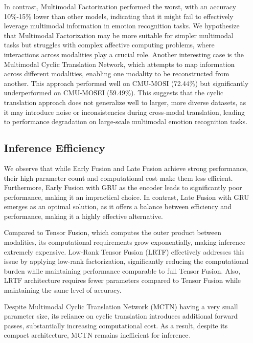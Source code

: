 \documentclass{article}
\begin{document}
In contrast, Multimodal Factorization performed the worst, with an accuracy 10\%-15\% lower than other models, indicating that it might fail to effectively leverage multimodal information in emotion recognition tasks. We hypothesize that Multimodal Factorization may be more suitable for simpler multimodal tasks but struggles with complex affective computing problems, where interactions across modalities play a crucial role. Another interesting case is the Multimodal Cyclic Translation Network, which attempts to map information across different modalities, enabling one modality to be reconstructed from another. This approach performed well on CMU-MOSI (72.44\%) but significantly underperformed on CMU-MOSEI (59.49\%). This suggests that the cyclic translation approach does not generalize well to larger, more diverse datasets, as it may introduce noise or inconsistencies during cross-modal translation, leading to performance degradation on large-scale multimodal emotion recognition tasks.

\subsection{Inference Efficiency}
We observe that while Early Fusion and Late Fusion achieve strong performance, their high parameter count and computational cost make them less efficient. Furthermore, Early Fusion with GRU as the encoder leads to significantly poor performance, making it an impractical choice. In contrast, Late Fusion with GRU emerges as an optimal solution, as it offers a balance between efficiency and performance, making it a highly effective alternative.

Compared to Tensor Fusion, which computes the outer product between modalities, its computational requirements grow exponentially, making inference extremely expensive. Low-Rank Tensor Fusion (LRTF) effectively addresses this issue by applying low-rank factorization, significantly reducing the computational burden while maintaining performance comparable to full Tensor Fusion. Also, LRTF architecture requires fewer parameters compared to Tensor Fusion while maintaining the same level of accuracy.

\newpage
Despite Multimodal Cyclic Translation Network (MCTN) having a very small parameter size, its reliance on cyclic translation introduces additional forward passes, substantially increasing computational cost. As a result, despite its compact architecture, MCTN remains inefficient for inference.
\end{document}

